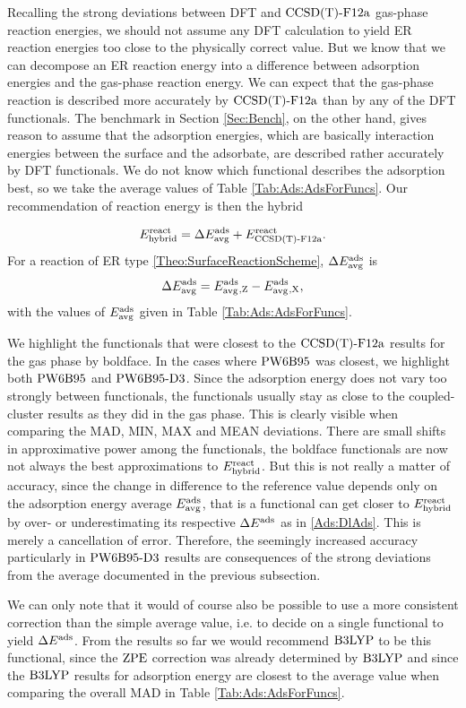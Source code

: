 \documentclass[8.5pt,twoside,twocolumn]{article}
\newcommand\zpe{\enmat{\te{ZPE}}}
\newcommand\eads{\enmat{E^{\te{ads}}}}
\newcommand\ere{\enmat{E^{\te{react}}}}
\theoremstyle{standard}
\begin{document}
Recalling the strong deviations between DFT and $\text{CCSD(T)-F12a}$ gas-phase
reaction energies, we should not assume any DFT calculation to yield
ER reaction energies too close to the physically correct value. But we know
that we can decompose an ER reaction energy into a difference between
adsorption energies and the gas-phase reaction energy. We can expect that
the gas-phase reaction is described more accurately by $\text{CCSD(T)-F12a}$ than by
any of the DFT functionals. The benchmark in Section \ref{Sec:Bench}, on
the other hand, gives reason to assume that the adsorption energies, which
are basically interaction energies between the surface and the adsorbate,
are described rather accurately by DFT functionals. We do not know which
functional describes the adsorption best, so we take the average values
of Table \ref{Tab:Ads:AdsForFuncs}. Our recommendation of reaction
energy is then the hybrid

\begin{equation}
 \erehyb=\Dl\avg + \ere_{\ccsdtf}.
\end{equation}
For a reaction of ER type \eqref{Theo:SurfaceReactionScheme}, $\Delta E_{\text {avg}}^{\text{ads}}$
is
\begin{equation}
 \Delta E_{\text {avg}}^{\text{ads}} = E_{\text {avg}}^{\text{ads}}{_{,\text Z}} - E_{\text {avg}}^{\text{ads}}{_{,\text X}},
 \label{Ads:DlAds}
\end{equation}
with the values of $E_{\text {avg}}^{\text{ads}}$ given in Table \ref{Tab:Ads:AdsForFuncs}. 

We highlight the functionals that were closest to the $\text{CCSD(T)-F12a}$
results for the gas phase by boldface. In the cases where $\text{PW6B95}$ was closest,
we highlight both $\text{PW6B95}$ and $\text{PW6B95}\text{-D3}$. Since the adsorption energy does not vary too 
strongly between functionals, the functionals usually stay 
as close to the coupled-cluster results as they did in the gas phase. This
is clearly visible when comparing the MAD, MIN, MAX and MEAN deviations.
There are small shifts in approximative power among the functionals,
the boldface functionals are now not always the best approximations to
$\erehyb$.
But this is not really a matter of accuracy, since the change in difference
to the reference value depends only on the adsorption energy average $E_{\text {avg}}^{\text{ads}}$,
that is a functional can get closer to $\erehyb$ by over- or underestimating
its respective $\Dl\eads$ as in \eqref{Ads:DlAds}. This is merely a cancellation
of error. Therefore, the seemingly increased accuracy particularly in
$\text{PW6B95}\text{-D3}$ results are consequences of the strong deviations from the average
documented in the previous subsection.

We can only note that it would
of course also be possible to use a more consistent correction than the simple
average value, i.e. to decide on a single functional to yield $\Dl\eads$.
From the results so far we would
recommend $\text{B3LYP}$ to be this functional, since the $\zpe$ correction
was already determined by $\text{B3LYP}$ and since the $\text{B3LYP}$ results for
adsorption energy are closest to the average value when comparing the
overall MAD in Table \ref{Tab:Ads:AdsForFuncs}. 
\end{document}
